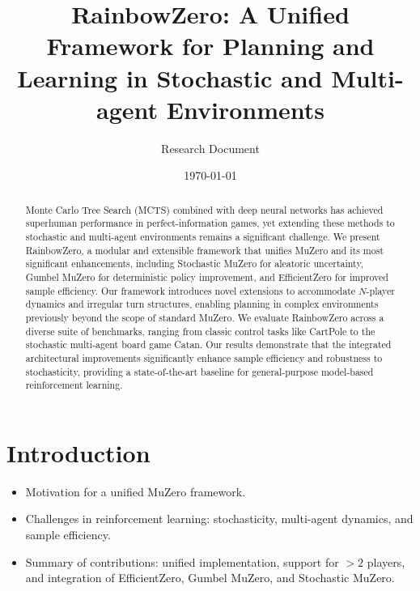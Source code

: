 \documentclass[twocolumn,10pt]{article}
\title{RainbowZero: A Unified Framework for Planning and Learning in Stochastic and Multi-agent Environments}
\author{Research Document}
\date{\today}
\begin{document}
\maketitle

\begin{abstract}
Monte Carlo Tree Search (MCTS) combined with deep neural networks has achieved superhuman performance in perfect-information games, yet extending these methods to stochastic and multi-agent environments remains a significant challenge. We present RainbowZero, a modular and extensible framework that unifies MuZero and its most significant enhancements, including Stochastic MuZero for aleatoric uncertainty, Gumbel MuZero for deterministic policy improvement, and EfficientZero for improved sample efficiency. Our framework introduces novel extensions to accommodate $N$-player dynamics and irregular turn structures, enabling planning in complex environments previously beyond the scope of standard MuZero. We evaluate RainbowZero across a diverse suite of benchmarks, ranging from classic control tasks like CartPole to the stochastic multi-agent board game Catan. Our results demonstrate that the integrated architectural improvements significantly enhance sample efficiency and robustness to stochasticity, providing a state-of-the-art baseline for general-purpose model-based reinforcement learning.
\end{abstract}

\section{Introduction}
\begin{itemize}
    \item Motivation for a unified MuZero framework.
    \item Challenges in reinforcement learning: stochasticity, multi-agent dynamics, and sample efficiency.
    \item Summary of contributions: unified implementation, support for $>2$ players, and integration of EfficientZero, Gumbel MuZero, and Stochastic MuZero.
\end{itemize}
\end{document}
